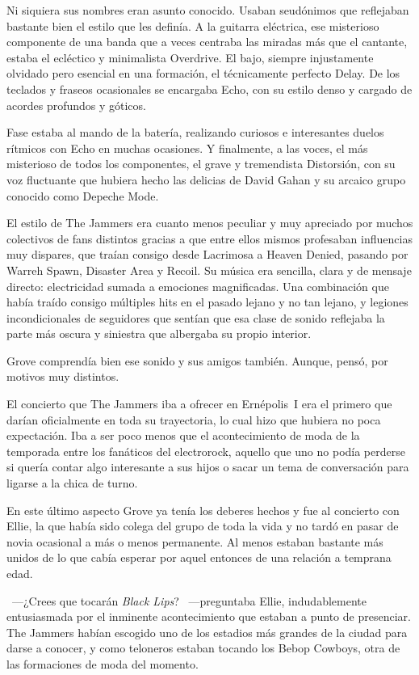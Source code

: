 Ni siquiera sus nombres eran asunto conocido. Usaban seudónimos que reflejaban bastante bien el estilo que les definía. A la guitarra eléctrica, ese misterioso componente de una banda que a veces centraba las miradas más que el cantante, estaba el ecléctico y minimalista Overdrive. El bajo, siempre injustamente olvidado pero esencial en una formación, el técnicamente perfecto Delay. De los teclados y fraseos ocasionales se encargaba Echo, con su estilo denso y cargado de acordes profundos y góticos.

Fase estaba al mando de la batería, realizando curiosos e interesantes duelos rítmicos con Echo en muchas ocasiones. Y finalmente, a las voces, el más misterioso de todos los componentes, el grave y tremendista Distorsión, con su voz fluctuante que hubiera hecho las delicias de David Gahan y su arcaico grupo conocido como Depeche Mode.

El estilo de The Jammers era cuanto menos peculiar y muy apreciado por muchos colectivos de fans distintos gracias a que entre ellos mismos profesaban influencias muy dispares, que traían consigo desde Lacrimosa a Heaven Denied, pasando por Warreh Spawn, Disaster Area y Recoil. Su música era sencilla, clara y de mensaje directo: electricidad sumada a emociones magnificadas. Una combinación que había traído consigo múltiples hits en el pasado lejano y no tan lejano, y legiones incondicionales de seguidores que sentían que esa clase de sonido reflejaba la parte más oscura y siniestra que albergaba su propio interior.

Grove comprendía bien ese sonido y sus amigos también. Aunque, pensó, por motivos muy distintos.

El concierto que The Jammers iba a ofrecer en Ernépolis~I era el primero que darían oficialmente en toda su trayectoria, lo cual hizo que hubiera no poca expectación. Iba a ser poco menos que el acontecimiento de moda de la temporada entre los fanáticos del electrorock, aquello que uno no podía perderse si quería contar algo interesante a sus hijos o sacar un tema de conversación para ligarse a la chica de turno.

En este último aspecto Grove ya tenía los deberes hechos y fue al concierto con Ellie, la que había sido colega del grupo de toda la vida y no tardó en pasar de novia ocasional a más o menos permanente. Al menos estaban bastante más unidos de lo que cabía esperar por aquel entonces de una relación a temprana edad.

~---¿Crees que tocarán \emph{Black Lips}? ~---preguntaba Ellie, indudablemente entusiasmada por el inminente acontecimiento que estaban a punto de presenciar. The Jammers habían escogido uno de los estadios más grandes de la ciudad para darse a conocer, y como teloneros estaban tocando los Bebop Cowboys, otra de las formaciones de moda del momento.

